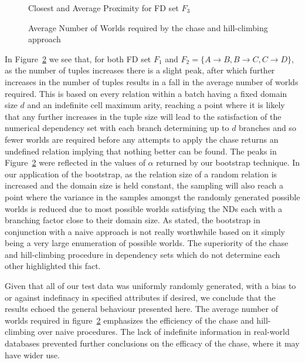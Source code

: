 \begin{figure}
\centerline{}
\caption{\label{graph:4.2} {Closest and Average Proximity for FD set $F_3$  }}
\end{figure}

\begin{figure}
\centerline{}
\caption{\label{graph:4.3} { Average Number of Worlds required by
the chase and hill-climbing approach}}
\end{figure}

In Figure~\ref{graph:4.3} we see that, for both FD set $F_1$ and 
$F_2 = \{ A \to B, B \to C, C \to D \}$, as the number of tuples
increases there is a slight peak, after which further increases in the number
of tuples results in a fall in the average number of worlds required.
This is based on every relation within a batch having a fixed domain
size $d$ and an indefinite cell maximum arity, reaching a point where it is
likely that any further increases in the tuple size will lead to the
satisfaction of the numerical dependency set with each branch determining
up to $d$ branches and so fewer worlds are required before any 
attempts to apply the chase returns an undefined relation implying that
nothing better can be found. The peaks in Figure~\ref{graph:4.3} were reflected in the values
of $\alpha$ returned by our bootstrap technique. In our
application of the bootstrap, as the relation size of a random relation 
is increased and the domain size is held constant, the sampling will also
reach a point where the variance in the samples amongst the randomly
generated possible worlds is reduced due to most possible worlds 
satisfying the NDs each with a branching factor close to their domain
size.  As stated, the bootstrap in conjunction 
with a naive approach is not really worthwhile based on it simply being
a very large enumeration of possible worlds. The superiority of
the chase and hill-climbing
procedure in dependency sets which do not determine each other highlighted
this fact.

\medskip

Given that all of our test data was uniformly randomly generated, with
a bias to or against indefinacy in specified attributes if desired, we
conclude that the results echoed the general behaviour
presented here. The average number of worlds required in
figure~\ref{graph:4.3} emphasizes the efficiency of the chase and
hill-climbing over naive procedures.
The lack of indefinite information in real-world databases prevented
further conclusions on the efficacy of the chase, where it may have
wider use.

